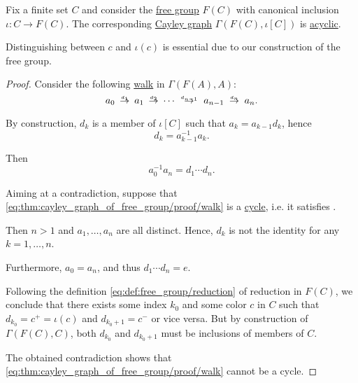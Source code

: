 \begin{proposition}\label{thm:cayley_graph_of_free_group}
  Fix a finite set \( C \) and consider the \hyperref[def:free_group]{free group} \( F(C) \) with canonical inclusion \( \iota: C \to F(C) \). The corresponding \hyperref[def:cayley_graph]{Cayley graph} \( \Gamma(F(C), \iota[C]) \) is \hyperref[def:acyclic_graph]{acyclic}.
\end{proposition}
\begin{comments}
  \item Distinguishing between \( c \) and \( \iota(c) \) is essential due to our construction of the free group.
\end{comments}
\begin{proof}
  Consider the following \hyperref[def:graph_walk]{walk} in \( \Gamma(F(A), A) \):
  \begin{equation}\label{eq:thm:cayley_graph_of_free_group/proof/walk}
    a_0 \reloset {d_1} \to a_1 \reloset {d_2} \to \cdots \reloset {d_{n-1}} \to a_{n-1} \reloset {d_n} \to a_n.
  \end{equation}

  By construction, \( d_k \) is a member of \( \iota[C] \) such that \( a_k = a_{k-1} d_k \), hence
  \begin{equation*}
    d_k = a_{k-1}^{-1} a_k.
  \end{equation*}

  Then
  \begin{equation*}
    a_0^{-1} a_n = d_1 \cdots d_n.
  \end{equation*}

  Aiming at a contradiction, suppose that \eqref{eq:thm:cayley_graph_of_free_group/proof/walk} is a \hyperref[def:graph_cycle]{cycle}, i.e. it satisfies .

  Then \( n > 1 \) and \( a_1, \ldots, a_n \) are all distinct. Hence, \( d_k \) is not the identity for any \( k = 1, \ldots, n \).

  Furthermore, \( a_0 = a_n \), and thus \( d_1 \cdots d_n = e \).

  Following the definition \eqref{eq:def:free_group/reduction} of reduction in \( F(C) \), we conclude that there exists some index \( k_0 \) and some color \( c \) in \( C \) such that \( d_{k_0} = c^+ = \iota(c) \) and \( d_{k_0 + 1} = c^- \) or vice versa. But by construction of \( \Gamma(F(C), C) \), both \( d_{k_0} \) and \( d_{k_0 + 1} \) must be inclusions of members of \( C \).

  The obtained contradiction shows that \eqref{eq:thm:cayley_graph_of_free_group/proof/walk} cannot be a cycle.
\end{proof}
